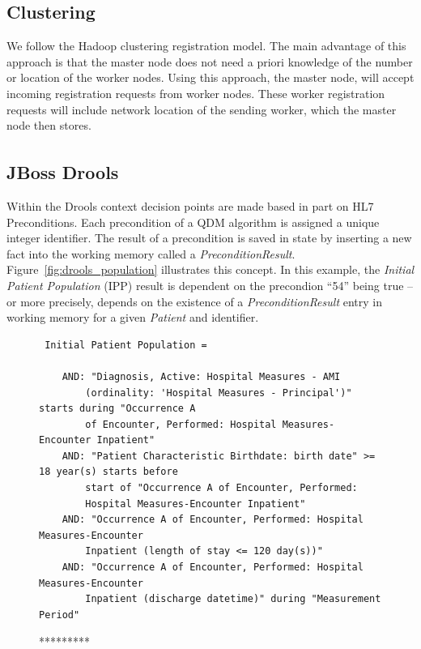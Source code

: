 \documentclass{amia}
\begin{document}
\subsection*{Clustering}

We follow the Hadoop clustering registration model\cite{wang2009hadoop}. The main advantage of this approach is that the master node does not need a priori knowledge of the number or location of the worker nodes. Using this approach, the master node, will accept incoming registration requests from worker nodes. These worker registration requests will include network location of the sending worker, which the master node then stores.

\subsection*{JBoss{\textsuperscript{\textregistered}} Drools}
Within the Drools context decision points are made based in part on HL7 Preconditions. Each precondition of a QDM algorithm is assigned a unique integer identifier. The result of a precondition is saved in state by inserting a new fact into the working memory called a \textit{PreconditionResult}.  Figure~\ref{fig:drools_population} illustrates this concept. In this example, the \textit{Initial Patient Population} (IPP) result is dependent on the precondion ``54'' being true -- or more precisely, depends on the existence of a \textit{PreconditionResult} entry in working memory for a given \textit{Patient} and identifier.

\begin{figure}[H]
\begin{verbatim}
 Initial Patient Population =

    AND: "Diagnosis, Active: Hospital Measures - AMI 
        (ordinality: 'Hospital Measures - Principal')" starts during "Occurrence A
        of Encounter, Performed: Hospital Measures-Encounter Inpatient"
    AND: "Patient Characteristic Birthdate: birth date" >= 18 year(s) starts before
        start of "Occurrence A of Encounter, Performed: 
        Hospital Measures-Encounter Inpatient"
    AND: "Occurrence A of Encounter, Performed: Hospital Measures-Encounter
        Inpatient (length of stay <= 120 day(s))"
    AND: "Occurrence A of Encounter, Performed: Hospital Measures-Encounter
        Inpatient (discharge datetime)" during "Measurement Period"
\end{verbatim}
\caption{*********} 
\label{fig:*****s}
\end{figure}
\end{document}
